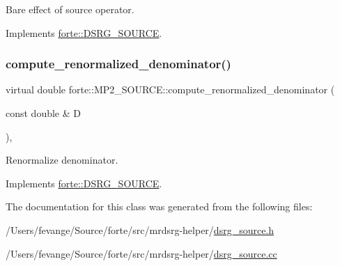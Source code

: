 Bare effect of source operator. 



Implements \mbox{\hyperlink{classforte_1_1_d_s_r_g___s_o_u_r_c_e_a8b4c4428bb50af4561c256e3180f6b31}{forte\+::\+D\+S\+R\+G\+\_\+\+S\+O\+U\+R\+CE}}.

\mbox{\label{classforte_1_1_m_p2___s_o_u_r_c_e_a7aabae75b519e6b52d8fc88626fc1895}} 
\subsubsection{\texorpdfstring{compute\+\_\+renormalized\+\_\+denominator()}{compute\_renormalized\_denominator()}}
{\footnotesize\ttfamily virtual double forte\+::\+M\+P2\+\_\+\+S\+O\+U\+R\+C\+E\+::compute\+\_\+renormalized\+\_\+denominator (\begin{DoxyParamCaption}\item[{const double \&}]{D }\end{DoxyParamCaption})\hspace{0.3cm}{\ttfamily [inline]}, {\ttfamily [virtual]}}



Renormalize denominator. 



Implements \mbox{\hyperlink{classforte_1_1_d_s_r_g___s_o_u_r_c_e_a7345ba63c3612369be7c4cc896b7d5c4}{forte\+::\+D\+S\+R\+G\+\_\+\+S\+O\+U\+R\+CE}}.



The documentation for this class was generated from the following files\+:\begin{DoxyCompactItemize}
\item 
/\+Users/fevange/\+Source/forte/src/mrdsrg-\/helper/\mbox{\hyperlink{dsrg__source_8h}{dsrg\+\_\+source.\+h}}\item 
/\+Users/fevange/\+Source/forte/src/mrdsrg-\/helper/\mbox{\hyperlink{dsrg__source_8cc}{dsrg\+\_\+source.\+cc}}\end{DoxyCompactItemize}
